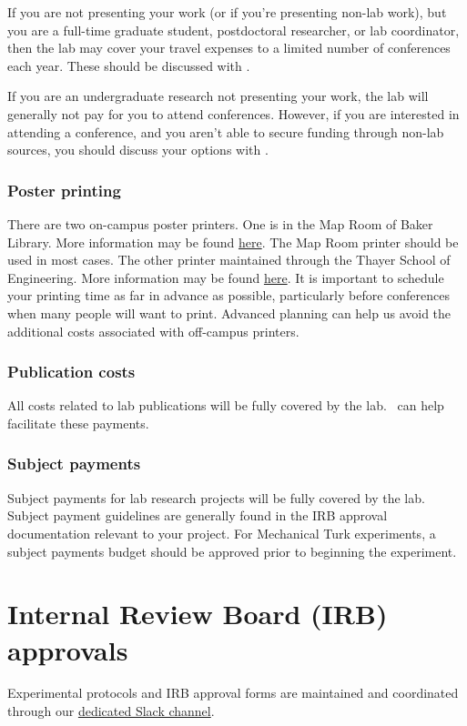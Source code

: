 \documentclass{tufte-book} %
\begin{document}
 If you are not presenting your work (or if you're presenting non-lab
 work), but you are a full-time graduate student, postdoctoral
 researcher, or lab coordinator, then the lab may cover your travel
 expenses to a limited number of conferences each year.  These should
 be discussed with \director.

If you are an undergraduate research not presenting your work, the lab
will generally not pay for you to attend conferences.  However, if you
are interested in attending a conference, and you aren't able to
secure funding through non-lab sources, you should discuss your
options with \director.

 \subsection{Poster printing}
 There are two on-campus poster printers.  One is in the Map Room of
 Baker Library.  More information may be found
 \href{http://www.dartmouth.edu/~library/maproom/printingfaq.html}{here}.
 The Map Room printer should be used in most cases.  The other printer
 maintained through the Thayer School of Engineering.  More
 information may be found
 \href{http://kb.thayer.dartmouth.edu/article/286-printing}{here}.  It
 is important to schedule your printing time as far in advance as
 possible, particularly before conferences when many people will want
 to print.  Advanced planning can help us avoid the additional costs
 associated with off-campus printers.


 \subsection{Publication costs}
All costs related to lab publications will be fully covered by the
lab.  \coordinator~can help facilitate these payments.

 \subsection{Subject payments}
 Subject payments for lab research projects will be fully covered by
 the lab.  Subject payment guidelines are generally found in the IRB
 approval documentation relevant to your project.  For Mechanical Turk
 experiments, a subject payments budget should be approved prior to
 beginning the experiment.


\chapter{Internal Review Board (IRB) approvals}
Experimental  protocols and IRB approval forms are maintained and
coordinated through our
\href{https://context-lab.slack.com/archives/admin}{dedicated Slack
  channel}.
\end{document}
